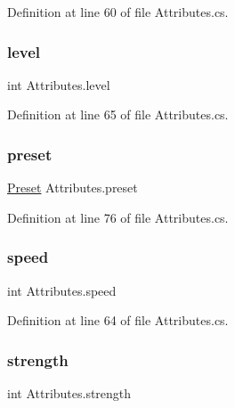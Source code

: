 Definition at line 60 of file Attributes.\+cs.

\mbox{\label{class_attributes_a1ff4257de32284cf7489849787cb82fb}} 
\subsubsection{\texorpdfstring{level}{level}}
{\footnotesize\ttfamily int Attributes.\+level\hspace{0.3cm}{\ttfamily [get]}}



Definition at line 65 of file Attributes.\+cs.

\mbox{\label{class_attributes_ad6b0d037f9b58413a7cb7be3065cf743}} 
\subsubsection{\texorpdfstring{preset}{preset}}
{\footnotesize\ttfamily \mbox{\hyperlink{class_attributes_a2dcc4757e5dd7b7d518f43f4f194d175}{Preset}} Attributes.\+preset\hspace{0.3cm}{\ttfamily [get]}}



Definition at line 76 of file Attributes.\+cs.

\mbox{\label{class_attributes_aa67231ed5d1163506d8d2d559a98e125}} 
\subsubsection{\texorpdfstring{speed}{speed}}
{\footnotesize\ttfamily int Attributes.\+speed\hspace{0.3cm}{\ttfamily [get]}}



Definition at line 64 of file Attributes.\+cs.

\mbox{\label{class_attributes_a80e15a2316352cfba56fc1d4077dd432}} 
\subsubsection{\texorpdfstring{strength}{strength}}
{\footnotesize\ttfamily int Attributes.\+strength\hspace{0.3cm}{\ttfamily [get]}}



